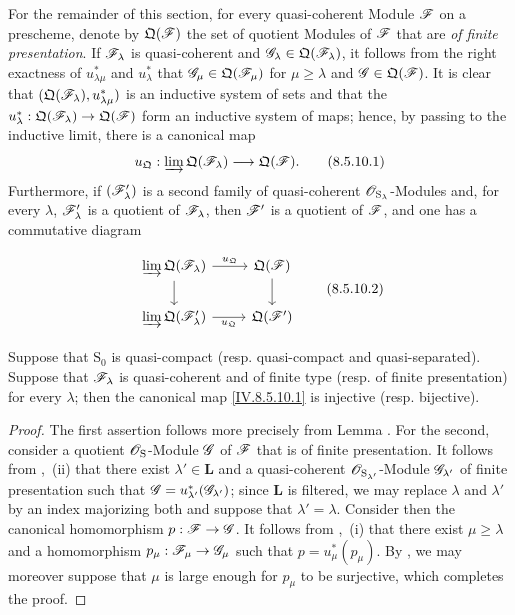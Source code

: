 \begin{env}[8.5.10]
\label{IV.8.5.10}
For the remainder of this section, for every quasi-coherent Module $\mathscr{F}$ on a prescheme, denote by $\mathfrak{Q}(\mathscr{F})$ the set of quotient Modules of $\mathscr{F}$ that are \emph{of finite presentation}. If $\mathscr{F}_\lambda$ is quasi-coherent and $\mathscr{G}_\lambda\in\mathfrak{Q}(\mathscr{F}_\lambda)$, it follows from the right exactness of $u_{\lambda\mu}^*$ and $u_\lambda^*$ that $\mathscr{G}_\mu\in\mathfrak{Q}(\mathscr{F}_\mu)$ for $\mu\geqslant\lambda$ and $\mathscr{G}\in\mathfrak{Q}(\mathscr{F})$. It is clear that $(\mathfrak{Q}(\mathscr{F}_\lambda),u_{\lambda\mu}^*)$ is an inductive system of sets and that the $u_\lambda^*:\mathfrak{Q}(\mathscr{F}_\lambda)\to\mathfrak{Q}(\mathscr{F})$ form an inductive system of maps; hence, by passing to the inductive limit, there is a canonical map
\[
u_{\mathfrak{Q}}:\varinjlim\mathfrak{Q}(\mathscr{F}_\lambda)\longrightarrow\mathfrak{Q}(\mathscr{F}).
\tag{8.5.10.1}\label{IV.8.5.10.1}
\]
Furthermore, if $(\mathscr{F}'_\lambda)$ is a second family of quasi-coherent $\mathscr{O}_{\mathrm{S}_\lambda}$-Modules and, for every $\lambda$, $\mathscr{F}'_\lambda$ is a quotient of $\mathscr{F}_\lambda$, then $\mathscr{F}'$ is a quotient of $\mathscr{F}$, and one has a commutative diagram


\[
\begin{tikzcd}
\varinjlim\mathfrak{Q}(\sh{F}_\lambda) \ar[r,"u_{\mathfrak{Q}}"] \ar[d] & \mathfrak{Q}(\sh{F}) \ar[d] \\
\varinjlim\mathfrak{Q}(\sh{F}'_\lambda) \ar[r,"u_{\mathfrak{Q}}"'] & \mathfrak{Q}(\sh{F}')
\end{tikzcd}
\tag{8.5.10.2}\label{IV.8.5.10.2}
\]
\end{env}

\begin{proposition}[8.5.11]
\label{IV.8.5.11}
Suppose that $\mathrm{S}_0$ is quasi-compact \textup{(resp.} quasi-compact and quasi-separated\textup{)}. Suppose that $\mathscr{F}_\lambda$ is quasi-coherent and of finite type \textup{(resp.} of finite presentation\textup{)} for every $\lambda$; then the canonical map \eqref{IV.8.5.10.1} is injective \textup{(resp.} bijective\textup{)}.
\end{proposition}

\begin{proof}
The first assertion follows more precisely from Lemma . For the second, consider a quotient $\mathscr{O}_{\mathrm{S}}$-Module $\mathscr{G}$ of $\mathscr{F}$ that is of finite presentation. It follows from ,~(ii) that there exist $\lambda'\in\mathbf{L}$ and a quasi-coherent $\mathscr{O}_{\mathrm{S}_{\lambda'}}$-Module $\mathscr{G}_{\lambda'}$ of finite presentation such that $\mathscr{G}=u_{\lambda'}^*(\mathscr{G}_{\lambda'})$; since $\mathbf{L}$ is filtered, we may replace $\lambda$ and $\lambda'$ by an index majorizing both and suppose that $\lambda'=\lambda$. Consider then the canonical homomorphism $p:\mathscr{F}\to\mathscr{G}$. It follows from ,~(i) that there exist $\mu\geqslant\lambda$ and a homomorphism $p_\mu:\mathscr{F}_\mu\to\mathscr{G}_\mu$ such that $p=u_\mu^*(p_\mu)$. By , we may moreover suppose that $\mu$ is large enough for $p_\mu$ to be surjective, which completes the proof.
\end{proof}

